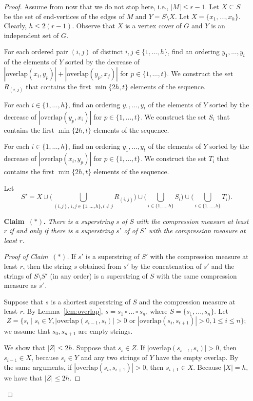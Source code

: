 \documentclass[11pt]{article}
\newcommand{\overlap}{\textrm{overlap}}
\begin{document}
\begin{proof}
Assume from now that we do not stop here, i.e., $|M|\leq r-1$. Let $X\subseteq S$ be the set of end-vertices of the edges of $M$ and $Y=S\setminus X$. Let $X=\{x_1,\ldots,x_h\}$. Clearly, $h\leq 2(r-1)$. Observe that $X$ is a vertex cover of $G$ and $Y$ is an independent set of $G$. 

For each ordered pair $(i,j)$ of distinct $i,j\in\{1,\ldots,h\}$, find an ordering $y_1,\ldots,y_t$ of the elements of $Y$ sorted by the decrease of $|\overlap(x_i,y_p)|+|\overlap(y_p,x_j)|$ for $p\in\{1,\ldots,t\}$. We construct the set $R_{(i,j)}$ that contains the first $\min\{2h,t\}$ elements of the sequence.

For each $i\in\{1,\ldots,h\}$, find an ordering $y_1,\ldots,y_t$ of the elements of $Y$ sorted by the decrease of $|\overlap(y_p,x_i)|$ for $p\in\{1,\ldots,t\}$. We construct the set $S_i$ that contains the first $\min\{2h,t\}$ elements of the sequence.

For each $i\in\{1,\ldots,h\}$, find an ordering $y_1,\ldots,y_t$ of the elements of $Y$ sorted by the decrease of $|\overlap(x_i,y_p)|$ for $p\in\{1,\ldots,t\}$. We construct the set $T_i$ that contains the first $\min\{2h,t\}$ elements of the sequence.

Let $$S'=X\cup \big(\bigcup_{(i,j),~i,j\in\{1,\ldots,h\},i\neq j}R_{(i,j)}\big)\cup\big(\bigcup_{i\in
\{1,\ldots,h\}}S_i \big)\cup\big(\bigcup_{i\in
\{1,\ldots,h\}}T_i \big).$$

\medskip
\noindent
{\bf Claim~$(*)$.} {\it There is a superstring $s$ of $S$ with the compression measure at least $r$ if and only if there is a superstring $s'$ of of $S'$ with the compression measure at least $r$. }

\begin{proof}[Proof of Claim~$(*)$]
If $s'$ is a superstring of $S'$ with the compression measure at least $r$, then the string $s$ obtained from $s'$ by the concatenation of $s'$ and the strings of $S\setminus S'$ (in any order) is a superstring of $S$ with the same compression measure as $s'$.

Suppose that $s$ is a shortest superstring of $S$ and the compression measure  at least $r$. By Lemma~\ref{lem:overlap}, $s=s_1\circ\ldots\circ s_n$, where $S=\{s_1,\ldots,s_n\}$.
Let $$Z=\{s_i\mid s_i\in Y, |\overlap(s_{i-1},s_i)|>0\text{ or }|\overlap(s_i,s_{i+1})|>0,1\leq i\leq n\};$$ 
we assume that $s_0,s_{n+1}$ are empty strings. 

We show that $|Z|\leq 2h$. Suppose that $s_i\in Z$. If $|\overlap(s_{i-1},s_i)|>0$, then $s_{i-1}\in X$, because $s_i\in Y$ and any two strings of $Y$ have the empty overlap.
By the same arguments, if   $|\overlap(s_i,s_{i+1})|>0$, then $s_{i+1}\in X$. Because $|X|=h$, we have that $|Z|\leq 2h$.


\end{proof}
\end{proof}
\end{document}
